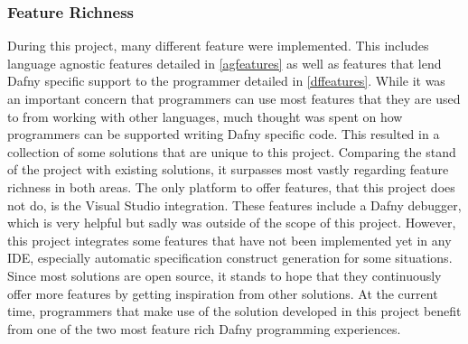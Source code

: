 \subsubsection{Feature Richness}
During this project, many different feature were implemented. This includes language agnostic features detailed in \ref{agfeatures} as well as features that lend Dafny specific support to the programmer detailed in \ref{dffeatures}. While it was an important concern that programmers can use most features that they are used to from working with other languages, much thought was spent on how programmers can be supported writing Dafny specific code. This resulted in a collection of some solutions that are unique to this project. \newline
Comparing the stand of the project with existing solutions, it surpasses most vastly regarding feature richness in both areas. The only platform to offer features, that this project does not do, is the Visual Studio integration. These features include a Dafny debugger, which is very helpful but sadly was outside of the scope of this project. However, this project integrates some features that have not been implemented yet in any IDE, especially automatic specification construct generation for some situations. \newline
Since most solutions are open source, it stands to hope that they continuously offer more features by getting inspiration from other solutions. At the current time, programmers that make use of the solution developed in this project benefit from one of the two most feature rich Dafny programming experiences. 




